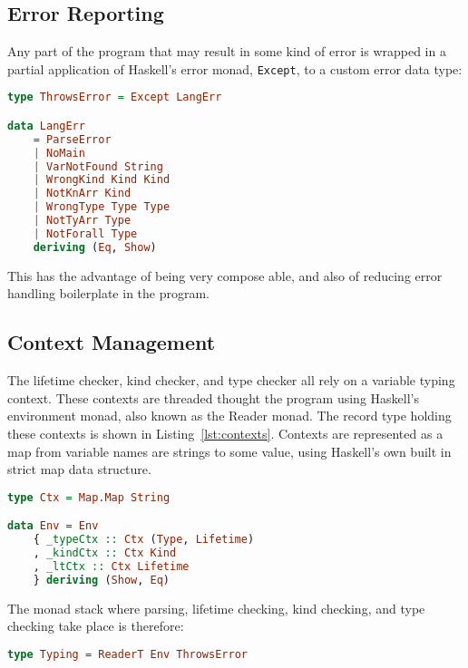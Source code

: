 \subsection{Error Reporting}
Any part of the program that may result in some kind of error is wrapped in a
partial application of Haskell's error monad, \lstinline{Except}, to a custom
error data type:

\begin{lstlisting}[caption=Partially applied error monad and language errors., language=Haskell, label={lst:types}]
type ThrowsError = Except LangErr

data LangErr
    = ParseError
    | NoMain
    | VarNotFound String
    | WrongKind Kind Kind
    | NotKnArr Kind
    | WrongType Type Type
    | NotTyArr Type
    | NotForall Type
    deriving (Eq, Show)
\end{lstlisting}

This has the advantage of being very compose able, and also of reducing error
handling boilerplate in the program.

\subsection{Context Management}\label{sec:ctx}
The lifetime checker, kind checker, and type checker all rely on a variable
typing context. These contexts are threaded thought the program using Haskell's
environment monad, also known as the Reader monad. The record type holding
these contexts is shown in Listing~\ref{lst:contexts}. Contexts are represented
as a map from variable names are strings to some value, using Haskell's own
built in strict map data structure.

\begin{lstlisting}[caption=Record data type showing contexts., language=Haskell, label={lst:contexts}]
type Ctx = Map.Map String

data Env = Env
    { _typeCtx :: Ctx (Type, Lifetime)
    , _kindCtx :: Ctx Kind
    , _ltCtx :: Ctx Lifetime
    } deriving (Show, Eq)
\end{lstlisting}

The monad stack where parsing, lifetime checking, kind checking, and type
checking take place is therefore:

\begin{lstlisting}[caption=Envirnment and error monad stack., language=Haskell, label={lst:monads}]
type Typing = ReaderT Env ThrowsError
\end{lstlisting}


